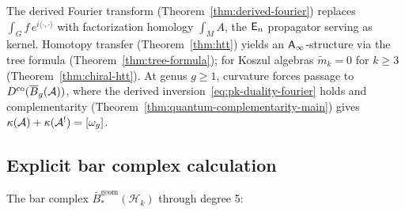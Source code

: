 \begin{remark}
\label{rem:fh-fourier}\label{rem:htt-fourier}\label{rem:curved-fourier}
The derived Fourier transform (Theorem~\ref{thm:derived-fourier}) replaces $\int_G f\, e^{i\langle\cdot,\cdot\rangle}$ with factorization homology $\int_M A$, the $\mathsf{E}_n$ propagator serving as kernel.  Homotopy transfer (Theorem~\ref{thm:htt}) yields an $\mathsf{A}_{\infty}$-structure via the tree formula (Theorem~\ref{thm:tree-formula}); for Koszul algebras $\tilde{m}_k = 0$ for $k \geq 3$ (Theorem~\ref{thm:chiral-htt}).  At genus $g \geq 1$, curvature forces passage to $D^{\mathrm{co}}(\overline{B}_g(\mathcal{A}))$, where the derived inversion~\eqref{eq:pk-duality-fourier} holds and complementarity (Theorem~\ref{thm:quantum-complementarity-main}) gives $\kappa(\mathcal{A}) + \kappa(\mathcal{A}^!) = [\omega_g]$.
\end{remark}

\subsection{Explicit bar complex calculation}

The bar complex $\bar{B}^{\text{geom}}_*(\mathcal{H}_k)$ through degree 5:

